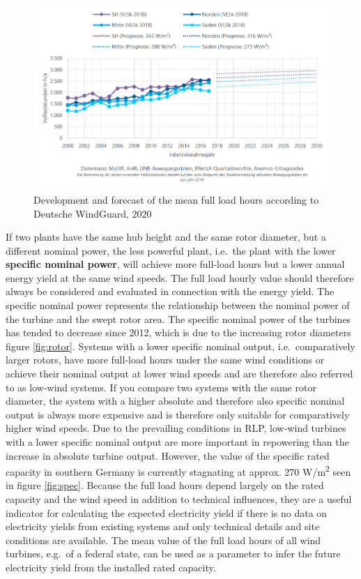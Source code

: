 \documentclass[a4paper,11pt]{article}
\begin{document}
\begin{figure}

{\centering \includegraphics[width=1\linewidth]{figures/DWG/DWG_Volllaststunden} 

}

\caption{Development and forecast of the mean full load hours according to Deutsche WindGuard, 2020}\label{fig:flh}
\end{figure}
If two plants have the same hub height and the same rotor diameter, but a different nominal power, the less powerful plant, i.e.~the plant with the lower \textbf{specific nominal power}, will achieve more full-load hours but a lower annual energy yield at the same wind speeds. The full load hourly value should therefore always be considered and evaluated in connection with the energy yield. The specific nominal power represents the relationship between the nominal power of the turbine and the swept rotor area. The specific nominal power of the turbines has tended to decrease since 2012, which is due to the increasing rotor diameters figure \ref{fig:rotor}. Systems with a lower specific nominal output, i.e.~comparatively larger rotors, have more full-load hours under the same wind conditions or achieve their nominal output at lower wind speeds and are therefore also referred to as low-wind systems. If you compare two systems with the same rotor diameter, the system with a higher absolute and therefore also specific nominal output is always more expensive and is therefore only suitable for comparatively higher wind speeds. Due to the prevailing conditions in RLP, low-wind turbines with a lower specific nominal output are more important in repowering than the increase in absolute turbine output. However, the value of the specific rated capacity in southern Germany is currently stagnating at approx. 270 W/m\textsuperscript{2} seen in figure \ref{fig:spec}. Because the full load hours depend largely on the rated capacity and the wind speed in addition to technical influences, they are a useful indicator for calculating the expected electricity yield if there is no data on electricity yields from existing systems and only technical details and site conditions are available. The mean value of the full load hours of all wind turbines, e.g.~of a federal state, can be used as a parameter to infer the future electricity yield from the installed rated capacity.
\end{document}
